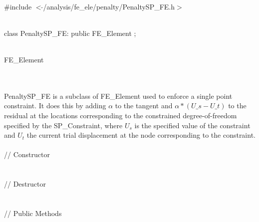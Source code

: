 
   \\
\#include $<\tilde{ }$/analysis/fe\_ele/penalty/PenaltySP\_FE.h$>$  


  \\
class PenaltySP\_FE: public FE\_Element ;  


  \\
FE\_Element 

\indent{} \\ 

  \\
\indent PenaltySP\_FE is a subclass of FE\_Element used to enforce a
single point constraint. It does this by adding $\alpha$ to the
tangent and $\alpha * (U\_s - U\_t)$ to the residual at the locations
corresponding to the constrained degree-of-freedom specified by the
SP\_Constraint, where $U_s$ is the specified value of the constraint
and $U_t$ the current trial displacement at the node corresponding to
the constraint.\\


  \\
\indent\indent // Constructor  \\
\indent{} \\ \\
\indent\indent // Destructor  \\
\indent{}  \\ \\
\indent\indent // Public Methods \\
\indent{} \\ 
\indent{} \\  
\indent{} \\ 
\indent{}\\

